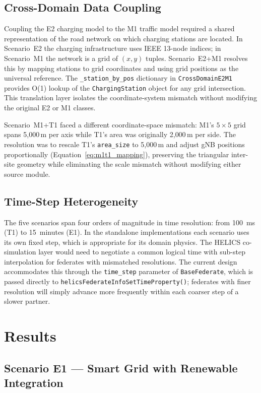 \subsection{Cross-Domain Data Coupling}

Coupling the E2 charging model to the M1 traffic model required a shared representation of the road network on which charging stations are located. In Scenario~E2 the charging infrastructure uses IEEE 13-node indices; in Scenario~M1 the network is a grid of $(x,y)$ tuples. Scenario~E2+M1 resolves this by mapping stations to grid coordinates and using grid positions as the universal reference. The \texttt{\_station\_by\_pos} dictionary in \texttt{CrossDomainE2M1} provides O(1) lookup of the \texttt{ChargingStation} object for any grid intersection. This translation layer isolates the coordinate-system mismatch without modifying the original E2 or M1 classes.

Scenario~M1+T1 faced a different coordinate-space mismatch: M1's $5 \times 5$ grid spans 5{,}000\,m per axis while T1's area was originally 2{,}000\,m per side. The resolution was to rescale T1's \texttt{area\_size} to 5{,}000\,m and adjust gNB positions proportionally (Equation~\ref{eq:m1t1_mapping}), preserving the triangular inter-site geometry while eliminating the scale mismatch without modifying either source module.

\subsection{Time-Step Heterogeneity}

The five scenarios span four orders of magnitude in time resolution: from 100~ms (T1) to 15~minutes (E1). In the standalone implementations each scenario uses its own fixed step, which is appropriate for its domain physics. The HELICS co-simulation layer would need to negotiate a common logical time with sub-step interpolation for federates with mismatched resolutions. The current design accommodates this through the \texttt{time\_step} parameter of \texttt{BaseFederate}, which is passed directly to \texttt{helicsFederateInfoSetTimeProperty()}; federates with finer resolution will simply advance more frequently within each coarser step of a slower partner.


\section{Results}

\subsection{Scenario E1 --- Smart Grid with Renewable Integration}

